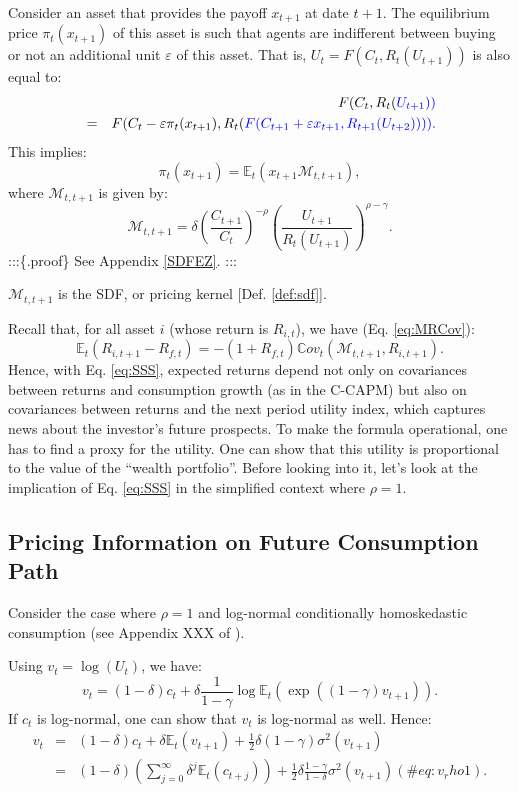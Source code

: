 \documentclass[
  12pt,
]{book}
\theoremstyle{definition}
\theoremstyle{definition}
\theoremstyle{definition}
\theoremstyle{definition}
\theoremstyle{remark}
\begin{document}
Consider an asset that provides the payoff \(x_{t+1}\) at date \(t+1\).
The equilibrium price \(\pi_t(x_{t+1})\) of this asset is such that agents are indifferent between buying or not an additional unit \(\varepsilon\) of this asset.
That is, \(U_t = F(C_t,R_t(U_{t+1}))\) is also equal to:
\begin{eqnarray}
&&  F(C_t,R_t(\color{blue}{U_{t+1}})) \nonumber \\
&=&F(C_t-\varepsilon \pi_t(x_{t+1}),R_t(\color{blue}{F(C_{t+1}+\varepsilon x_{t+1},R_{t+1}(U_{t+2}))})).\label{eq:SDFV}
\end{eqnarray}
This implies:
\[
\pi_t(x_{t+1}) = \mathbb{E}_t \left( x_{t+1} \mathcal{M}_{t,t+1} \right),
\]
where \(\mathcal{M}_{t,t+1}\) is given by:
\begin{equation}
\mathcal{M}_{t,t+1}= \delta \left(\frac{C_{t+1}}{C_t}\right)^{-\rho}  \left(\frac{U_{t+1}}{R_{t}(U_{t+1})}\right)^{\rho-\gamma}.\label{eq:SSS}
\end{equation}
:::\{.proof\}
See Appendix \ref{SDFEZ}.
:::

\(\mathcal{M}_{t,t+1}\) is the SDF, or pricing kernel {[}Def. \ref{def:sdf}{]}.

Recall that, for all asset \(i\) (whose return is \(R_{i,t}\)), we have (Eq. \eqref{eq:MRCov}):
\[
\mathbb{E}_t(R_{i,t+1} - R_{f,t}) = - (1 + R_{f,t}) \mathbb{C}ov_t(\mathcal{M}_{t,t+1},R_{i,t+1}).
\]
Hence, with Eq. \eqref{eq:SSS}, expected returns depend not only on covariances between returns and consumption growth (as in the C-CAPM) but also on covariances between returns and the next period utility index, which captures news about the investor's future prospects.
To make the formula operational, one has to find a proxy for the utility. One can show that this utility is proportional to the value of the ``wealth portfolio''.
Before looking into it, let's look at the implication of Eq. \eqref{eq:SSS} in the simplified context where \(\rho = 1\).

\hypertarget{pricing-information-on-future-consumption-path}{%
\subsection{Pricing Information on Future Consumption Path}\label{pricing-information-on-future-consumption-path}}

Consider the case where \(\rho = 1\) and log-normal conditionally homoskedastic consumption (see Appendix XXX of \citet{Cochrane_2005}).

Using \(v_t = \log(U_t)\), we have:
\[
v_t = (1 - \delta) c_t + \delta \frac{1}{1 - \gamma} \log \mathbb{E}_t \left(\exp((1-\gamma)v_{t+1})\right).
\]
If \(c_t\) is log-normal, one can show that \(v_t\) is log-normal as well. Hence:
\begin{eqnarray}
v_t &=& (1 - \delta) c_t + \delta \mathbb{E}_t(v_{t+1}) + \frac{1}{2}\delta (1-\gamma) \sigma^2(v_{t+1})\nonumber \\
&=& (1 - \delta) \left( \sum_{j=0}^{\infty}  \delta^j \mathbb{E}_t (c_{t+j}) \right) + \frac{1}{2}\delta \frac{1-\gamma}{1-\delta} \sigma^2(v_{t+1}) (\#eq:v_rho1).
\end{eqnarray}
\end{document}
